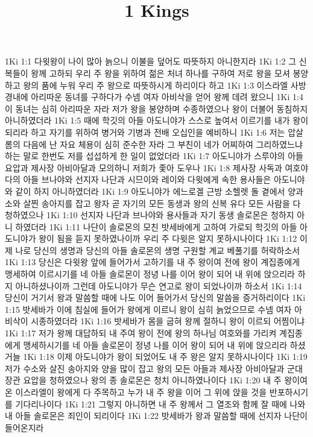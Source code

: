 

\title{1 Kings}

1Ki 1:1  다윗왕이 나이 많아 늙으니 이불을 덮어도 따뜻하지 아니한지라
1Ki 1:2  그 신복들이 왕께 고하되 우리 주 왕을 위하여 젊은 처녀 하나를 구하여 저로 왕을 모셔 봉양하고 왕의 품에 누워 우리 주 왕으로 따뜻하시게 하리이다 하고
1Ki 1:3  이스라엘 사방 경내에 아리따운 동녀를 구하다가 수넴 여자 아비삭을 얻어 왕께 데려 왔으니
1Ki 1:4  이 동녀는 심히 아리따운 자라 저가 왕을 봉양하며 수종하였으나 왕이 더불어 동침하지 아니하였더라
1Ki 1:5  때에 학깃의 아들 아도니야가 스스로 높여서 이르기를 내가 왕이되리라 하고 자기를 위하여 병거와 기병과 전배 오십인을 예비하니
1Ki 1:6  저는 압살롬의 다음에 난 자요 체용이 심히 준수한 자라 그 부친이 네가 어찌하여 그리하였느냐 하는 말로 한번도 저를 섭섭하게 한 일이 없었더라
1Ki 1:7  아도니야가 스루야의 아들 요압과 제사장 아비아달과 모의하니 저희가 좇아 도우나
1Ki 1:8  제사장 사독과 여호야다의 아들 브나야와 선지자 나단과 시므이와 레이와 다윗에게 속한 용사들은 아도니야와 같이 하지 아니하였더라
1Ki 1:9  아도니야가 에느로겔 근방 소헬렛 돌 곁에서 양과 소와 살찐 송아지를 잡고 왕자 곧 자기의 모든 동생과 왕의 신복 유다 모든 사람을 다 청하였으나
1Ki 1:10  선지자 나단과 브나야와 용사들과 자기 동생 솔로몬은 청하지 아니 하였더라
1Ki 1:11  나단이 솔로몬의 모친 밧세바에게 고하여 가로되 학깃의 아들 아도니야가 왕이 됨을 듣지 못하였나이까 우리 주 다윗은 알지 못하시나이다
1Ki 1:12  이제 나로 당신의 생명과 당신의 아들 솔로몬의 생명 구원할 계교 베풀기를 허락하소서
1Ki 1:13  당신은 다윗왕 앞에 들어가서 고하기를 내 주 왕이여 전에 왕이 계집종에게 맹세하여 이르시기를 네 아들 솔로몬이 정녕 나를 이어 왕이 되어 내 위에 앉으리라 하지 아니하셨나이까 그런데 아도니야가 무슨 연고로 왕이 되었나이까 하소서
1Ki 1:14  당신이 거기서 왕과 말씀할 때에 나도 이어 들어가서 당신의 말씀을 증거하리이다
1Ki 1:15  밧세바가 이에 침실에 들어가 왕에게 이르니 왕이 심히 늙었으므로 수넴 여자 아비삭이 시종하였더라
1Ki 1:16  밧세바가 몸을 굽혀 왕께 절하니 왕이 이르되 어찜이냐
1Ki 1:17  저가 왕께 대답하되 내 주여 왕이 전에 왕의 하나님 여호와를 가리켜 계집종에게 맹세하시기를 네 아들 솔로몬이 정녕 나를 이어 왕이 되어 내 위에 앉으리라 하셨거늘
1Ki 1:18  이제 아도니야가 왕이 되었어도 내 주 왕은 알지 못하시나이다
1Ki 1:19  저가 수소와 살진 송아지와 양을 많이 잡고 왕의 모든 아들과 제사장 아비아달과 군대장관 요압을 청하였으나 왕의 종 솔로몬은 청치 아니하였나이다
1Ki 1:20  내 주 왕이여 온 이스라엘이 왕에게 다 주목하고 누가 내 주 왕을 이어 그 위에 앉을 것을 반포하시기를 기다리나이다
1Ki 1:21  그렇지 아니하면 내 주 왕께서 그 열조와 함께 잘 때에 나와 내 아들 솔로몬은 죄인이 되리이다
1Ki 1:22  밧세바가 왕과 말씀할 때에 선지자 나단이 들어온지라
